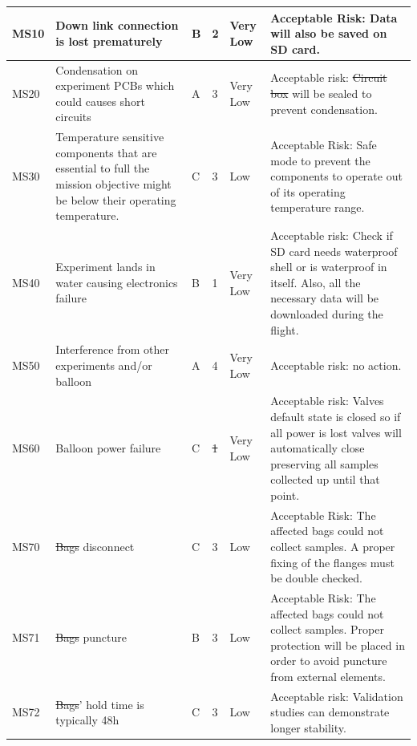\documentclass[a4paper,12pt,twoside]{article}
\providecommand{\DIFaddtex}[1]{{\protect\color{blue}\uwave{#1}}} %
\providecommand{\DIFdeltex}[1]{{\protect\color{red}\sout{#1}}}                      %
\providecommand{\DIFaddbegin}{} %
\providecommand{\DIFaddend}{} %
\providecommand{\DIFdelbegin}{} %
\providecommand{\DIFdelend}{} %
\providecommand{\DIFadd}[1]{\texorpdfstring{\DIFaddtex{#1}}{#1}} %
\providecommand{\DIFdel}[1]{\texorpdfstring{\DIFdeltex{#1}}{}} %
\newcommand{\DIFscaledelfig}{0.5}
\newlength{\DIFdelgraphicswidth} %
\newlength{\DIFdelgraphicsheight} %
\newcommand{\DIFaddincludegraphics}[2][]{{\color{blue}\fbox{\DIFOincludegraphics[#1]{#2}}}} %
\newcommand{\DIFdelincludegraphics}[2][]{%
\sbox{\DIFdelgraphicsbox}{\DIFOincludegraphics[#1]{#2}}%
\settoboxwidth{\DIFdelgraphicswidth}{\DIFdelgraphicsbox} %
\settoboxtotalheight{\DIFdelgraphicsheight}{\DIFdelgraphicsbox} %
\scalebox{\DIFscaledelfig}{%
\parbox[b]{\DIFdelgraphicswidth}{\usebox{\DIFdelgraphicsbox}\\[-\baselineskip] \rule{\DIFdelgraphicswidth}{0em}}\llap{\resizebox{\DIFdelgraphicswidth}{\DIFdelgraphicsheight}{%
\setlength{\unitlength}{\DIFdelgraphicswidth}%
\begin{picture}(1,1)%
\thicklines\linethickness{2pt} %
{\color[rgb]{1,0,0}\put(0,0){\framebox(1,1){}}}%
{\color[rgb]{1,0,0}\put(0,0){\line( 1,1){1}}}%
{\color[rgb]{1,0,0}\put(0,1){\line(1,-1){1}}}%
\end{picture}%
}\hspace*{3pt}}} %
} %
\DeclareRobustCommand{\DIFaddbegin}{\DIFOaddbegin \let\includegraphics\DIFaddincludegraphics} %
\DeclareRobustCommand{\DIFaddend}{\DIFOaddend \let\includegraphics\DIFOincludegraphics} %
\DeclareRobustCommand{\DIFdelbegin}{\DIFOdelbegin \let\includegraphics\DIFdelincludegraphics} %
\DeclareRobustCommand{\DIFdelend}{\DIFOaddend \let\includegraphics\DIFOincludegraphics} %
\begin{document}
\begin{landscape}
\begin{longtable}{|m{}| m{} |m{} |m{}|m{}| m{}|}
\DIFaddend MS10 & Down link connection is lost prematurely & B & 2 & \cellcolor[HTML]{34FF34}Very Low & Acceptable Risk: Data will also be saved on SD card. \\ \hline
MS20 & Condensation on experiment PCBs which could causes short circuits & A & 3 & \cellcolor[HTML]{34FF34}Very Low & Acceptable risk: \DIFdelbegin \DIFdel{Circuit box }\DIFdelend \DIFaddbegin \DIFadd{The Brain }\DIFaddend will be sealed to prevent condensation. \\ \hline
MS30 & Temperature sensitive components that are essential to full the mission objective might be below their operating temperature. & C & 3 & \cellcolor[HTML]{FCFF2F}Low & Acceptable Risk: Safe mode to prevent the components to operate out of its operating temperature range. \\ \hline
MS40 & Experiment lands in water causing electronics failure & B & 1 & \cellcolor[HTML]{34FF34}Very Low & Acceptable risk: Check if SD card needs waterproof shell or is waterproof in itself. Also, all the necessary data will be downloaded during the flight. \\ \hline
MS50 & Interference from other experiments and/or balloon & A & 4 & \cellcolor[HTML]{34FF34}Very Low & Acceptable risk: no action. \\ \hline
MS60 & Balloon power failure & C & \DIFdelbegin \DIFdel{1 }\DIFdelend \DIFaddbegin \DIFadd{2 }\DIFaddend & \cellcolor[HTML]{34FF34}Very Low & Acceptable risk: Valves default state is closed so if all power is lost valves will automatically close preserving all samples collected up until that point. \\ \hline
MS70 & \DIFdelbegin \DIFdel{Bags }\DIFdelend \DIFaddbegin \DIFadd{Sampling bags }\DIFaddend disconnect & C & 3 & \cellcolor[HTML]{FCFF2F}Low & Acceptable Risk: The affected bags could not collect samples. A proper fixing of the flanges must be double checked.
\\ \hline
MS71 & \DIFdelbegin \DIFdel{Bags }\DIFdelend \DIFaddbegin \DIFadd{Sampling bags }\DIFaddend puncture & B & 3 & \cellcolor[HTML]{FCFF2F}Low & Acceptable Risk: The affected bags could not collect samples. Proper protection will be placed in order to avoid puncture from external elements. \\ \hline
MS72 & \DIFdelbegin \DIFdel{Bags}\DIFdelend \DIFaddbegin \DIFadd{Sampling bags}\DIFaddend ' hold time is typically 48h & C & 3 & \cellcolor[HTML]{FCFF2F}Low & Acceptable risk: Validation studies can demonstrate longer stability.  \\ \hline

\end{longtable}
\end{landscape}
\end{document}
